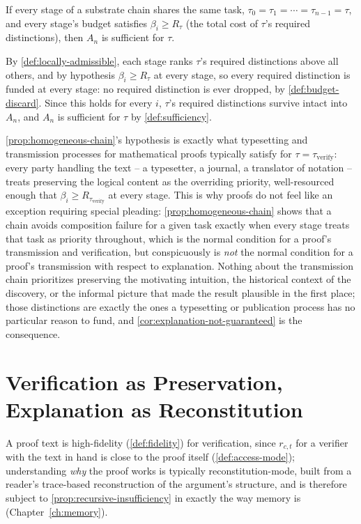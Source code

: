 \begin{proposition}
\label{prop:homogeneous-chain}
If every stage of a substrate chain shares the same task, $\tau_0 =
\tau_1 = \cdots = \tau_{n-1} = \tau$, and every stage's budget satisfies
$\beta_i \ge R_\tau$ (the total cost of $\tau$'s required distinctions),
then $A_n$ is sufficient for $\tau$.
\end{proposition}

\begin{proofsketch}
By \cref{def:locally-admissible}, each stage ranks $\tau$'s required
distinctions above all others, and by hypothesis $\beta_i \ge R_\tau$ at
every stage, so every required distinction is funded at every stage: no
required distinction is ever dropped, by \cref{def:budget-discard}. Since
this holds for every $i$, $\tau$'s required distinctions survive intact
into $A_n$, and $A_n$ is sufficient for $\tau$ by
\cref{def:sufficiency}.
\end{proofsketch}

\cref{prop:homogeneous-chain}'s hypothesis is exactly what typesetting
and transmission processes for mathematical proofs typically satisfy for
$\tau = \tau_{\text{verify}}$: every party handling the text -- a
typesetter, a journal, a translator of notation -- treats preserving the
logical content as the overriding priority, well-resourced enough that
$\beta_i \ge R_{\tau_{\text{verify}}}$ at every stage. This is why proofs
do not feel like an exception requiring special pleading:
\cref{prop:homogeneous-chain} shows that a chain avoids composition
failure for a given task exactly when every stage treats that task as
priority throughout, which is the normal condition for a proof's
transmission and verification, but conspicuously is \emph{not} the
normal condition for a proof's transmission with respect to explanation.
Nothing about the transmission chain prioritizes preserving the
motivating intuition, the historical context of the discovery, or the
informal picture that made the result plausible in the first place; those
distinctions are exactly the ones a typesetting or publication process
has no particular reason to fund, and \cref{cor:explanation-not-guaranteed}
is the consequence.

\section{Verification as Preservation, Explanation as Reconstitution}

A proof text is high-fidelity (\cref{def:fidelity}) for verification,
since $r_{c,t}$ for a verifier with the text in hand is close to the
proof itself (\cref{def:access-mode}); understanding \emph{why} the
proof works is typically reconstitution-mode, built from a reader's
trace-based reconstruction of the argument's structure, and is therefore
subject to \cref{prop:recursive-insufficiency} in exactly the way memory
is (Chapter~\ref{ch:memory}).

